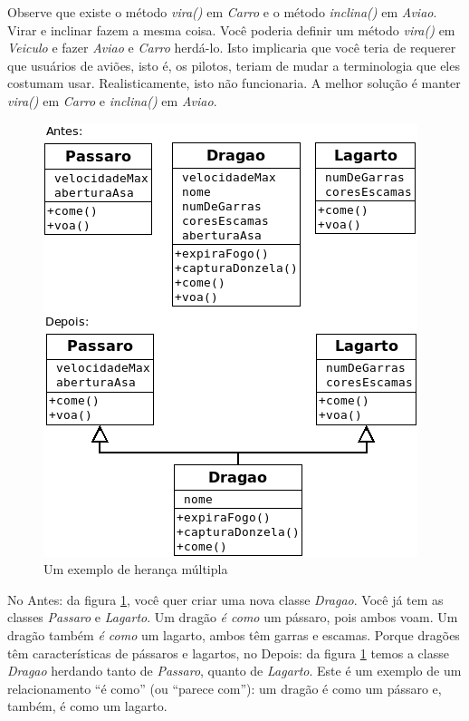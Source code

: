 Observe que existe o método \emph{vira()} em \emph{Carro} e o método \emph{inclina()} em \emph{Aviao}. Virar e inclinar fazem a mesma coisa. Você poderia definir um método \emph{vira()} em \emph{Veiculo} e fazer \emph{Aviao} e \emph{Carro} herdá-lo. Isto implicaria que você teria de requerer que usuários de aviões, isto é, os pilotos, teriam de mudar a terminologia que eles costumam usar. Realisticamente, isto não funcionaria. A melhor solução é manter \emph{vira()} em \emph{Carro} e \emph{inclina()} em \emph{Aviao}.

\begin{figure}
\begin{center}
\includegraphics[scale=0.6]{herMultCls.png} 
\caption{Um exemplo de herança múltipla} \label{fig:uml4}
\end{center}
\end{figure}

No Antes: da figura \ref{fig:uml4}, você quer criar uma nova classe \emph{Dragao}. Você já tem as classes \emph{Passaro} e \emph{Lagarto}. Um dragão \textit{é como} um pássaro, pois ambos voam. Um dragão também \textit{é como} um lagarto, ambos têm garras e escamas. Porque dragões têm características de pássaros e lagartos, no Depois: da figura \ref{fig:uml4} temos a classe \emph{Dragao} herdando tanto de \emph{Passaro}, quanto de \emph{Lagarto}. Este é um exemplo de um relacionamento ``é como'' (ou ``parece com''): um dragão é como um pássaro e, também, é como um lagarto.

